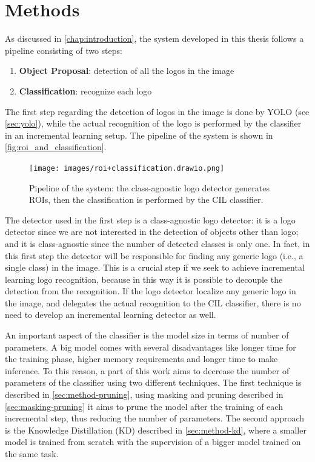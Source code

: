 \chapter{Methods}
\label{chap:methods}

As discussed in \autoref{chap:introduction}, the system developed in this thesis follows a pipeline consisting of two steps:
\begin{enumerate}
    \item \textbf{Object Proposal}: detection of all the logos in the image
    \item \textbf{Classification}: recognize each logo
\end{enumerate}
The first step regarding the detection of logos in the image is done by YOLO (see \autoref{sec:yolo}), while the actual recognition of the logo is performed by the classifier in an incremental learning setup. The pipeline of the system is shown in \autoref{fig:roi_and_classification}.

\begin{figure}%
	\centering

    \begin{center}
        \texttt{[image: images/roi+classification.drawio.png]}
    \end{center}

	\caption{Pipeline of the system: the class-agnostic logo detector generates ROIs, then the classification is performed by the CIL classifier.}%
	\label{fig:roi_and_classification}%
\end{figure}

The detector used in the first step is a class-agnostic logo detector: it is a logo detector since we are not interested in the detection of objects other than logo; and it is class-agnostic since the number of detected classes is only one. In fact, in this first step the detector will be responsible for finding any generic logo (i.e., a single class) in the image. This is a crucial step if we seek to achieve incremental learning logo recognition, because in this way it is possible to decouple the detection from the recognition. If the logo detector localize any generic logo in the image, and delegates the actual recognition to the CIL classifier, there is no need to develop an incremental learning detector as well.


An important aspect of the classifier is the model size in terms of number of parameters. A big model comes with several disadvantages like longer time for the training phase, higher memory requirements and longer time to make inference. To this reason, a part of this work aims to decrease the number of parameters of the classifier using two different techniques. The first technique is described in \autoref{sec:method-pruning}, using masking and pruning described in \autoref{sec:masking-pruning} it aims to prune the model after the training of each incremental step, thus reducing the number of parameters. The second approach is the Knowledge Distillation (KD) described in \autoref{sec:method-kd}, where a smaller model is trained from scratch with the supervision of a bigger model trained on the same task.

